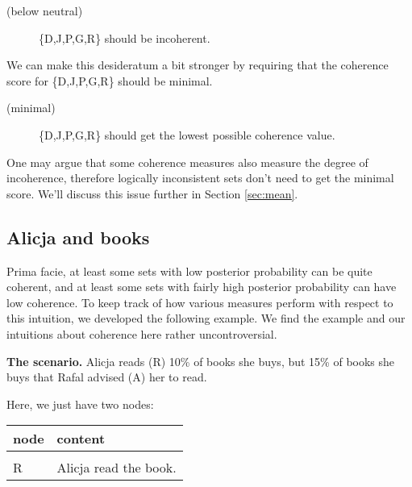 \documentclass[10pt,]{scrartcl}
\newcommand{\s}[1]{\mbox{\textsf{#1}}}
\begin{document}
\begin{description}
    \item[(below neutral)] \{\s{D,J,P,G,R}\} should be incoherent.
\end{description}

\vspace{2mm} We can make this desideratum a bit stronger by requiring
that the coherence score for \{\s{D,J,P,G,R}\} should be minimal.
\vspace{2mm}

\begin{description}
    \item[(minimal)] \{\s{D,J,P,G,R}\} should get the lowest possible coherence value.
\end{description}

\vspace{2mm} \noindent  One may argue that some coherence measures also
measure the degree of incoherence, therefore logically inconsistent sets
don't need to get the minimal score. We'll discuss this issue further in
Section \ref{sec:mean}.

\subsection{Alicja and books}

Prima facie, at least some sets with low posterior probability can be
quite coherent, and at least some sets with fairly high posterior
probability can have low coherence. To keep track of how various
measures perform with respect to this intuition, we developed the
following example. We find the example and our intuitions about
coherence here rather uncontroversial.

\noindent \textbf{The scenario.} Alicja reads (\textsf{R}) 10\% of books
she buys, but 15\% of books she buys that Rafal advised (\textsf{A}) her
to read.

Here, we just have two nodes:

\begin{table}[H]
\centering
\begin{tabular}{ll}
\toprule
node & content\\
\midrule
\cellcolor{gray!6}{A} & \cellcolor{gray!6}{Rafal adviced Alicja to read the book.}\\
R & Alicja read the book.\\
\bottomrule
\end{tabular}
\end{table}
\end{document}
